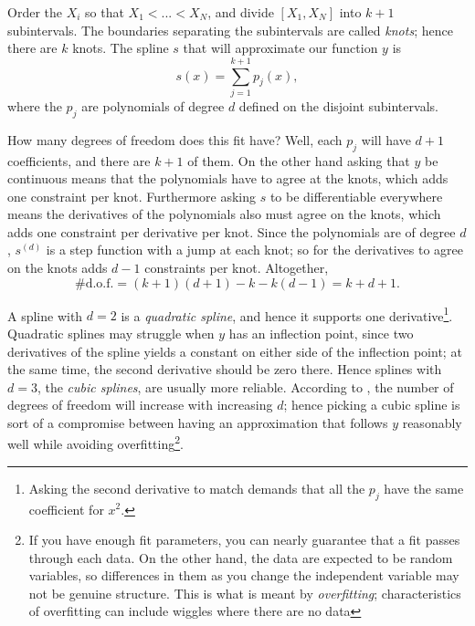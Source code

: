 Order the $X_i$ so that $X_1<...<X_N$, and divide $[X_1,X_N]$ into $k+1$
subintervals. The boundaries separating the subintervals are called {\it
knots}; hence there are $k$ knots. The spline
$s$ that will approximate our function $y$ is
\begin{equation}
s(x) = \sum_{j=1}^{k+1} p_j(x),
\end{equation}
where the $p_j$ are polynomials of degree $d$ defined on the disjoint 
subintervals.

How many degrees of freedom does this fit have? Well, each $p_j$ will have $d+1$
coefficients, and there are
$k+1$ of them. On the other hand asking that $y$ be continuous means that the
polynomials have to agree at the knots, which adds one constraint per knot. 
Furthermore asking $s$ to be differentiable everywhere means the derivatives of 
the polynomials also must agree on the knots, which adds one constraint per
derivative per knot. Since the polynomials are of degree $d$, $s^{(d)}$ is a
step function with a jump at each knot; so for the derivatives to agree on the
knots adds $d-1$ constraints per knot. Altogether, 
\begin{equation}\label{eq:splinedof}
\text{\# d.o.f.} = (k+1)(d+1)-k-k(d-1) = k + d + 1.
\end{equation}

A spline with $d=2$ is a {\it quadratic spline}, 
and hence it supports one derivative\footnote{Asking the second derivative to
match demands that all the $p_j$ have the same coefficient for $x^2$.}.
Quadratic splines may struggle when $y$ has an inflection point, since two
derivatives of the spline yields a constant on either side of the inflection
point; at the same time, the second derivative should be zero there. 
Hence splines with $d=3$, the {\it cubic splines}, are
usually more reliable. According to , the number of
degrees of freedom will increase with increasing $d$; hence picking a cubic
spline is sort of a compromise between having an approximation that follows $y$
reasonably well while avoiding overfitting\footnote{If you have enough fit
parameters, you can nearly guarantee that a fit passes through each data.
On the other hand, the data are expected to be random variables, so
differences in them as you change the independent variable may not be
genuine structure. This is what is meant by {\it
overfitting}; characteristics of overfitting can
include wiggles where there are no data}.

